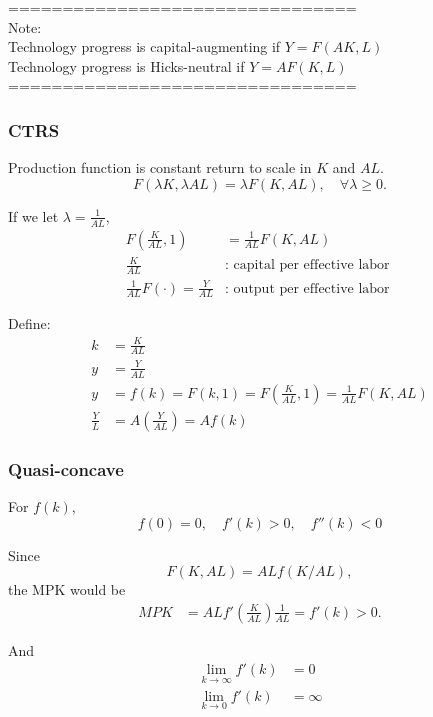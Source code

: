 \documentclass[12pt]{article}
\begin{document}
================================\\
Note:\\
Technology progress is capital-augmenting if $ Y = F(AK,L) $\\
Technology progress is Hicks-neutral if $ Y = AF(K,L) $\\
================================


\subsubsection{CTRS}
Production function is constant return to scale in $ K $ and $ AL $. 
\begin{equation*}
F(\lambda K, \lambda AL) = \lambda F(K, AL),\quad \forall \lambda \ge 0.
\end{equation*}

If we let $ \lambda = \frac{1}{AL} $,
\begin{align*}
F \left( \frac{K}{AL},1 \right)  &= \frac{1}{AL}F(K,AL)\\
\frac{K}{AL}&: \text{ capital per effective labor }\\
\frac{1}{AL}F(\cdot ) = \frac{Y}{AL}&: \text{ output per effective labor }
\end{align*}

Define:
\begin{align*}
k &= \frac{K}{AL}\\
y &= \frac{Y}{AL}\\
y &= f(k) = F(k,1) = F \left( \frac{K}{AL},1 \right) = \frac{1}{AL}F(K,AL)\\
\frac{Y}{L}&= A \left( \frac{Y}{AL} \right)  = Af(k)
\end{align*}

\subsubsection{Quasi-concave}
For $ f(k) $,
\begin{equation*}
f(0) = 0, \quad f'(k) > 0, \quad f''(k) < 0
\end{equation*}

Since 
\begin{equation*}
F(K,AL) = AL f(K/AL),
\end{equation*}
the MPK would be
\begin{align*}
MPK &= AL f'\left( \frac{K}{AL} \right) \frac{1}{AL} = f' (k) > 0.
\end{align*}

And
\begin{align*}
\lim_{k \to \infty} f'(k) &= 0\\
\lim_{k \to 0} f'(k) &= \infty 
\end{align*}
\end{document}
